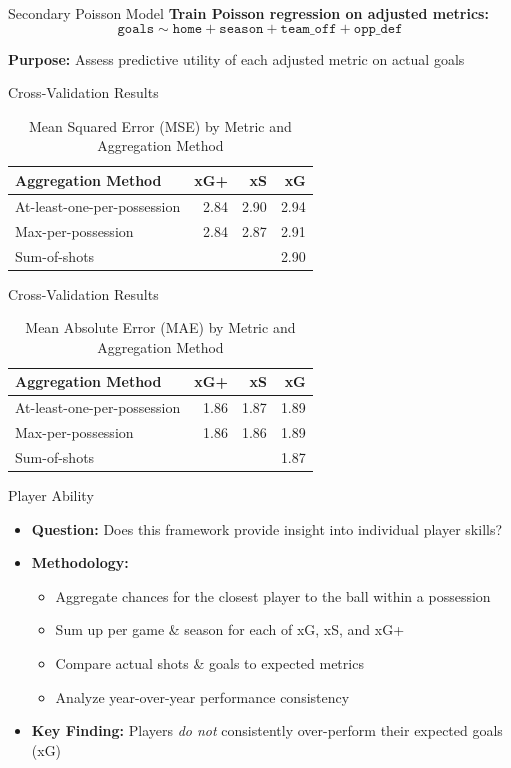 \documentclass{beamer}
\begin{document}
\begin{frame}{Secondary Poisson Model}
\textbf{Train Poisson regression on adjusted metrics:}
$$\texttt{goals} \sim \texttt{home} + \texttt{season} + \texttt{team\_off} + \texttt{opp\_def}$$

\textbf{Purpose:} Assess predictive utility of each adjusted metric on actual goals
\end{frame}

\begin{frame}{Cross-Validation Results}
\begin{table}[!h]
\centering
\caption{Mean Squared Error (MSE) by Metric and Aggregation Method}
\begin{tabular}[t]{lrrr}
\toprule
Aggregation Method & xG+ & xS & xG\\
\midrule
At-least-one-per-possession & 2.84 & 2.90 & 2.94\\
Max-per-possession & 2.84 & 2.87 & 2.91\\
Sum-of-shots &  &  & 2.90\\
\bottomrule
\end{tabular}
\end{table}
\end{frame}

\begin{frame}{Cross-Validation Results}
\begin{table}[!h]
\centering
\caption{Mean Absolute Error (MAE) by Metric and Aggregation Method}
\begin{tabular}[t]{lrrr}
\toprule
Aggregation Method & xG+ & xS & xG\\
\midrule
At-least-one-per-possession & 1.86 & 1.87 & 1.89\\
Max-per-possession & 1.86 & 1.86 & 1.89\\
Sum-of-shots &  &  & 1.87\\
\bottomrule
\end{tabular}
\end{table}
\end{frame}

\begin{frame}{Player Ability}
\begin{itemize}
\item \textbf{Question:} Does this framework provide insight into individual player skills?
\item \textbf{Methodology:}
  \begin{itemize}
  \item Aggregate chances for the closest player to the ball within a possession
  \item Sum up per game \& season for each of xG, xS, and xG+
  \item Compare actual shots \& goals to expected metrics
  \item Analyze year-over-year performance consistency
  \end{itemize}
\item \textbf{Key Finding:} Players \emph{do not} consistently over-perform their expected goals (xG)
\end{itemize}
\end{frame}
\end{document}
